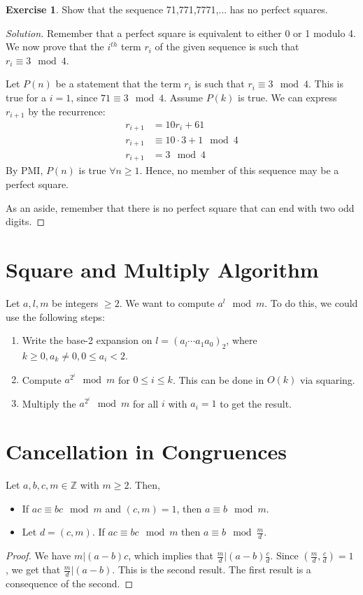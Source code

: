 \documentclass[12pt,letterpaper]{book}
\theoremstyle{definition}
\newtheorem*{exercise}{Exercise}
\newenvironment{solution}
  {\renewcommand\qedsymbol{$\blacksquare$}\begin{proof}[Solution]}
  {\end{proof}}
\newcommand{\Z}{\mathbb{Z}}
\begin{document}
\begin{exercise}
  Show that the sequence 71,771,7771,... has no perfect squares.
\end{exercise}
\begin{solution}
  Remember that a perfect square is equivalent to either 0 or 1 modulo 4. We now prove that the $i^{th}$ term $r_i$ of the given sequence is such that $r_i \equiv 3 \mod 4$.

  Let $P(n)$ be a statement that the term $r_i$ is such that $r_i \equiv 3 \mod 4$. This is true for a $i = 1$, since $71 \equiv 3 \mod 4$. Assume $P(k)$ is true. We can express $r_{i+1}$ by the recurrence:
  \begin{align*}
    r_{i+1} &= 10r_i + 61 \\
    r_{i+1} & \equiv 10 \cdot 3 + 1 \mod 4 \\
    r_{i+1} &= 3 \mod 4
  \end{align*}
  By PMI, $P(n)$ is true $\forall n \geq 1$. Hence, no member of this sequence may be a perfect square.

  As an aside, remember that there is no perfect square that can end with two odd digits.
\end{solution}

\section{Square and Multiply Algorithm}

Let $a,l,m$ be integers $\geq 2$. We want to compute $a^l \mod m$. To do this, we could use the following steps:

\begin{enumerate}
  \item Write the base-2 expansion on $l = (a_l \cdots a_1 a_0)_2$, where $k \geq 0, a_k \neq 0, 0 \leq a_i < 2$.
  \item Compute $a^{2^i} \mod m$ for $0 \leq i \leq k$. This can be done in $O(k)$ via squaring.
  \item Multiply the $a^{2^i} \mod m$ for all $i$ with $a_i = 1$ to get the result.
\end{enumerate}

\section{Cancellation in Congruences}
\phantom{}
\begin{theorem}
  Let $a,b,c,m \in \Z$ with $m \geq 2$. Then,
  \begin{itemize}
    \item If $ac \equiv bc \mod m$ and $(c,m) = 1$, then $a \equiv b \mod m$.
    \item Let $d = (c,m)$. If $ac \equiv bc \mod m$ then $a \equiv b \mod \frac{m}{d}$.
  \end{itemize}
\end{theorem}
\begin{proof}
  We have $m | (a-b)c$, which implies that $\frac{m}{d} | (a-b) \frac{c}{d}$. Since $(\frac{m}{d},\frac{c}{d})= 1$ , we get that $\frac{m}{d} | (a-b)$. This is the second result. The first result is a consequence of the second.
\end{proof}
\end{document}
